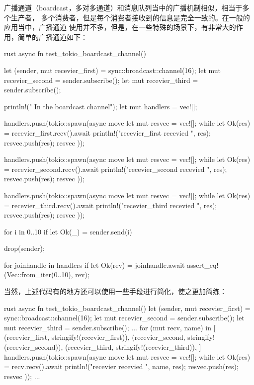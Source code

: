 广播通道（boardcast，多对多通道）和消息队列当中的广播机制相似，相当于多个生产者，
多个消费者，但是每个消费者接收到的信息是完全一致的。在一般的应用当中，广播通道
使用并不多，但是，在一些特殊的场景下，有非常大的作用，简单的广播通道如下：
\begin{code-block}{rust}
async fn test_tokio_boardcast_channel() {
    let (sender, mut recevier_first) = sync::broadcast::channel(16);
    let mut recevier_second = sender.subscribe();
    let mut recevier_third = sender.subscribe();

    println!(" In the boardcast channel");
    let mut handlers = vec![];

    handlers.push(tokio::spawn(async move {
        let mut resvec = vec![];
        while let Ok(res) = recevier_first.recv().await {
            println!("recevier_first recevied {}", res);
            resvec.push(res);
        }
        resvec
    }));

    handlers.push(tokio::spawn(async move {
        let mut resvec = vec![];
        while let Ok(res) = recevier_second.recv().await {
            println!("recevier_second recevied {}", res);
            resvec.push(res);
        }
        resvec
    }));

    handlers.push(tokio::spawn(async move {
        let mut resvec = vec![];
        while let Ok(res) = recevier_third.recv().await {
            println!("recevier_third recevied {}", res);
            resvec.push(res);
        }
        resvec
    }));

    for i in 0..10 {
        if let Ok(_) = sender.send(i) {}
    }

    drop(sender);

    for joinhandle in handlers {
        if let Ok(rev) = joinhandle.await {
            assert_eq!(Vec::from_iter(0..10), rev);
        }
    }
}
\end{code-block}

当然，上述代码有的地方还可以使用一些手段进行简化，使之更加简练：
\begin{code-block}{rust}
async fn test_tokio_boardcast_channel() {
    let (sender, mut recevier_first) = sync::broadcast::channel(16);
    let mut recevier_second = sender.subscribe();
    let mut recevier_third = sender.subscribe();
    ...
    for (mut recv, name) in [
        (recevier_first, stringify!(recevier_first)),
        (recevier_second, stringify!(recevier_second)),
        (recevier_third, stringify!(recevier_third)),
    ] {
        handlers.push(tokio::spawn(async move {
            let mut resvec = vec![];
            while let Ok(res) = recv.recv().await {
                println!("recevier {} recevied {}", name, res);
                resvec.push(res);
            }
            resvec
        }));
    }
    ...
}
\end{code-block}


